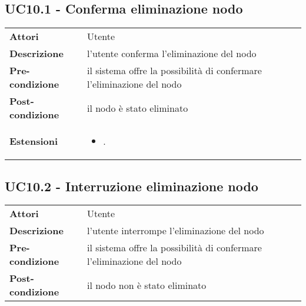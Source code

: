 \subsection{UC10.1 - Conferma eliminazione nodo}
\label{sssec:UC10.1}
\def\arraystretch{1.5}
\begin{tabularx}{\textwidth}{l|p{}}
\rowcolor{I} \multicolumn{2}{c}{\color{white}\textbf{UC10.1 - Conferma eliminazione nodo}} \\
\toprule
\endhead
\textbf{Attori} & Utente\\
\textbf{Descrizione} & l'utente conferma l'eliminazione del nodo\\
\textbf{Pre-condizione} & il sistema offre la possibilità di confermare l'eliminazione del nodo\\
\textbf{Post-condizione} & il nodo è stato eliminato\\
\textbf{Estensioni} & \vspace{-1.2em}\begin{itemize}[leftmargin=*,noitemsep,nosep]
\item \nameref{sssec:UC10.2}.
\end{itemize}\\
\bottomrule
\end{tabularx}
\subsection{UC10.2 - Interruzione eliminazione nodo}
\label{sssec:UC10.2}
\def\arraystretch{1.5}
\begin{tabularx}{\textwidth}{l|p{}}
\rowcolor{I} \multicolumn{2}{c}{\color{white}\textbf{UC10.2 - Interruzione eliminazione nodo}} \\
\toprule
\endhead
\textbf{Attori} & Utente\\
\textbf{Descrizione} & l'utente interrompe l'eliminazione del nodo\\
\textbf{Pre-condizione} & il sistema offre la possibilità di confermare l'eliminazione del nodo\\
\textbf{Post-condizione} & il nodo non è stato eliminato\\
\bottomrule
\end{tabularx}
